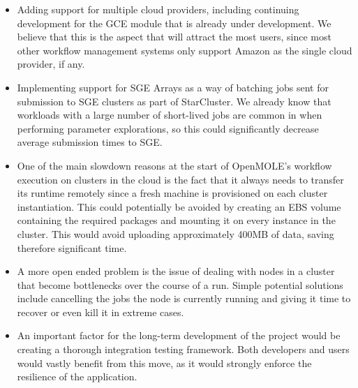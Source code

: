 \begin{itemize}
	\item Adding support for multiple cloud providers, including continuing development for the GCE module that is already under development. We believe that this is the aspect that will attract the most users, since most other workflow management systems only support Amazon as the single cloud provider, if any.
	\item Implementing support for SGE Arrays as a way of batching jobs sent for submission to SGE clusters as part of StarCluster. We already know that  workloads with a large number of short-lived jobs are common in when performing parameter explorations, so this could significantly decrease average submission times to SGE.
	\item One of the main slowdown reasons at the start of OpenMOLE's workflow execution on clusters in the cloud is the fact that it always needs to transfer its runtime remotely since a fresh machine is provisioned on each cluster instantiation. This could potentially be avoided by creating an EBS volume containing the required packages and mounting it on every instance in the cluster. This would avoid uploading approximately 400MB of data, saving therefore significant time.
	\item A more open ended problem is the issue of dealing with nodes in a cluster that become bottlenecks over the course of a run. Simple potential solutions include cancelling the jobs the node is currently running and giving it time to recover or even kill it in extreme cases.
	\item An important factor for the long-term development of the project would be creating a thorough integration testing framework. Both developers and users would vastly benefit from this move, as it would strongly enforce the resilience of the application.
\end{itemize}